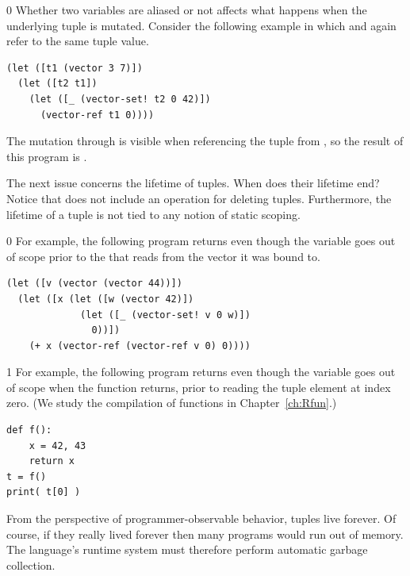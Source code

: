 \documentclass[7x10]{TimesAPriori_MIT}%
\def\racketEd{0}
\def\pythonEd{1}
\def\edition{1}
\begin{document}
{\if\edition\racketEd        
Whether two variables are aliased or not affects what happens
when the underlying tuple is mutated.
Consider the following example in which  and 
again refer to the same tuple value.
\begin{center}
\begin{minipage}{0.96\textwidth}
\begin{lstlisting}
(let ([t1 (vector 3 7)])
  (let ([t2 t1])
    (let ([_ (vector-set! t2 0 42)])
      (vector-ref t1 0))))
\end{lstlisting}
\end{minipage}
\end{center}
The mutation through  is visible when referencing the tuple
from , so the result of this program is .
\fi}

The next issue concerns the lifetime of tuples. When does their
lifetime end?  Notice that \LangVec{} does not include an operation
for deleting tuples. Furthermore, the lifetime of a tuple is not tied
to any notion of static scoping.
%
{\if\edition\racketEd        
%
For example, the following program returns  even though the
variable  goes out of scope prior to the 
that reads from the vector it was bound to.
\begin{center}
\begin{minipage}{0.96\textwidth}
\begin{lstlisting}
(let ([v (vector (vector 44))])
  (let ([x (let ([w (vector 42)])
             (let ([_ (vector-set! v 0 w)])
               0))])
    (+ x (vector-ref (vector-ref v 0) 0))))
\end{lstlisting}
\end{minipage}
\end{center}
\fi}
%
{\if\edition\pythonEd
%
For example, the following program returns  even though the
variable  goes out of scope when the function returns, prior
to reading the tuple element at index zero. (We study the compilation
of functions in Chapter~\ref{ch:Rfun}.)
%  
\begin{center}
\begin{minipage}{0.96\textwidth}
\begin{lstlisting}
def f():
    x = 42, 43
    return x
t = f()
print( t[0] )
\end{lstlisting}
\end{minipage}
\end{center}
\fi}
%
From the perspective of programmer-observable behavior, tuples live
forever. Of course, if they really lived forever then many programs
would run out of memory. The language's runtime system must therefore
perform automatic garbage collection.
\end{document}
